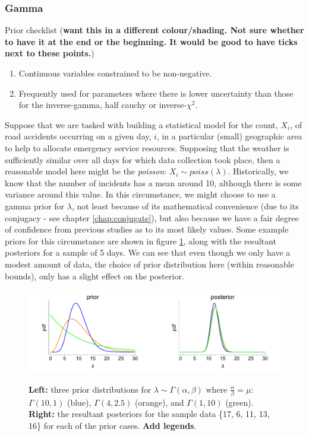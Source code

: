 \documentclass[11pt,fullpage]{book}
\begin{document}
\subsubsection{Gamma}\label{sec:Distributions_gamma}
Prior checklist (\textbf{want this in a different colour/shading. Not sure whether to have it at the end or the beginning. It would be good to have ticks next to these points.})

\begin{enumerate} 
\item Continuous variables constrained to be non-negative.
\item Frequently used for parameters where there is lower uncertainty than those for the inverse-gamma, half cauchy or inverse-$\chi^2$.
\end{enumerate}

Suppose that we are tasked with building a statistical model for the count, $X_i$, of road accidents occurring on a given day, $i$, in a particular (small) geographic area to help to allocate emergency service resources. Supposing that the weather is sufficiently similar over all days for which data collection took place, then a reasonable model here might be the \textit{poisson}: $X_i\sim poiss(\lambda)$. Historically, we know that the number of incidents has a mean around 10, although there is some variance around this value. In this circumstance, we might choose to use a gamma prior for $\lambda$, not least because of its mathematical convenience (due to its conjugacy - see chapter \ref{chap:conjugate}), but also because we have a fair degree of confidence from previous studies as to its most likely values. Some example priors for this circumstance are shown in figure \ref{fig:Distributions_gammaPrior}, along with the resultant posteriors for a sample of 5 days. We can see that even though we only have a modest amount of data, the choice of prior distribution here (within reasonable bounds), only has a slight effect on the posterior.

\begin{figure}
\centering
\scalebox{0.5} 
{\includegraphics{Distributions_gammaPrior.pdf}}
\caption{\textbf{Left:} three prior distributions for $\lambda\sim \Gamma(\alpha,\beta)$ where $\frac{\alpha}{\beta}=\mu$: $\Gamma(10,1)$ (blue), $\Gamma(4,2.5)$ (orange), and $\Gamma(1,10)$ (green). \textbf{Right:} the resultant posteriors for the sample data \{17, 6, 11, 13, 16\} for each of the prior cases. \textbf{Add legends}.}\label{fig:Distributions_gammaPrior}
\end{figure}
\end{document}
